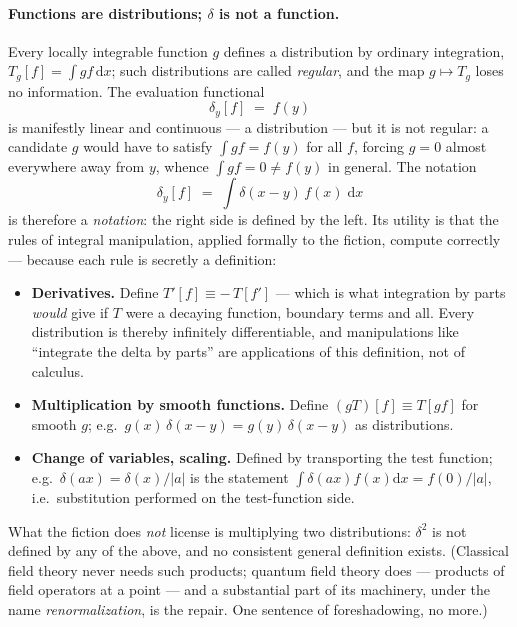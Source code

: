 \documentclass[11pt]{article}
\theoremstyle{plain}
\theoremstyle{definition}
\theoremstyle{remark}
\newcommand{\dd}{\mathrm{d}}
\begin{document}
\paragraph{Functions are distributions; $\delta$ is not a function.}
Every locally integrable function $g$ defines a distribution by
ordinary integration, $T_g[f] = \int g f\,\dd x$; such distributions
are called \emph{regular}, and the map $g \mapsto T_g$ loses no
information. The evaluation functional
\begin{equation}
  \delta_y[f] \;=\; f(y)
\end{equation}
is manifestly linear and continuous --- a distribution --- but it is
not regular: a candidate $g$ would have to satisfy
$\int g f = f(y)$ for all $f$, forcing $g = 0$ almost everywhere away
from $y$, whence $\int g f = 0 \ne f(y)$ in general. The notation
\begin{equation}
  \delta_y[f]
  \;=\;
  \int \delta(x - y)\, f(x)\;\dd x
\end{equation}
is therefore a \emph{notation}: the right side is defined by the
left. Its utility is that the rules of integral manipulation, applied
formally to the fiction, compute correctly --- because each rule is
secretly a definition:
\begin{itemize}
  \item \textbf{Derivatives.} Define $T'[f] \equiv -\,T[f']$ ---
  which is what integration by parts \emph{would} give if $T$ were a
  decaying function, boundary terms and all. Every distribution is
  thereby infinitely differentiable, and manipulations like
  ``integrate the delta by parts'' are applications of this
  definition, not of calculus.
  \item \textbf{Multiplication by smooth functions.} Define
  $(gT)[f] \equiv T[gf]$ for smooth $g$; e.g.\
  $g(x)\,\delta(x-y) = g(y)\,\delta(x-y)$ as distributions.
  \item \textbf{Change of variables, scaling.} Defined by transporting
  the test function; e.g.\ $\delta(ax) = \delta(x)/|a|$ is the
  statement $\int\delta(ax)f(x)\dd x = f(0)/|a|$, i.e.\ substitution
  performed on the test-function side.
\end{itemize}
What the fiction does \emph{not} license is multiplying two
distributions: $\delta^2$ is not defined by any of the above, and no
consistent general definition exists. (Classical field theory never
needs such products; quantum field theory does --- products of field
operators at a point --- and a substantial part of its machinery,
under the name \emph{renormalization}, is the repair. One sentence of
foreshadowing, no more.)
\end{document}
